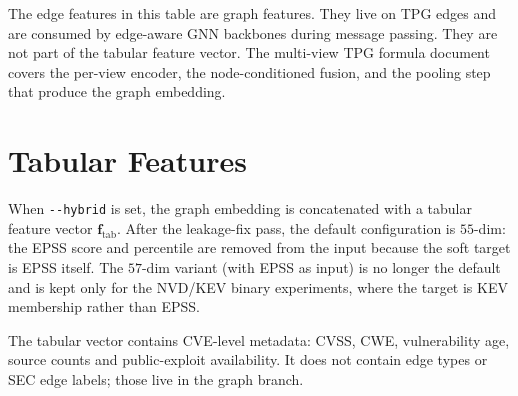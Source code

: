 \documentclass[11pt]{article}
\begin{document}
The edge features in this table are graph features. They live on TPG
edges and are consumed by edge-aware GNN backbones during message
passing. They are not part of the tabular feature vector. The
multi-view TPG formula document covers the per-view encoder, the
node-conditioned fusion, and the pooling step that produce the graph
embedding.

\section{Tabular Features}

When \verb|--hybrid| is set, the graph embedding is concatenated with
a tabular feature vector $\mathbf{f}_{\text{tab}}$. After the
leakage-fix pass, the default configuration is $55$-dim: the EPSS
score and percentile are removed from the input because the soft
target is EPSS itself. The $57$-dim variant (with EPSS as input) is no
longer the default and is kept only for the NVD/KEV binary
experiments, where the target is KEV membership rather than EPSS.

The tabular vector contains CVE-level metadata: CVSS, CWE,
vulnerability age, source counts and public-exploit availability. It
does not contain edge types or SEC edge labels; those live in the
graph branch.
\end{document}
